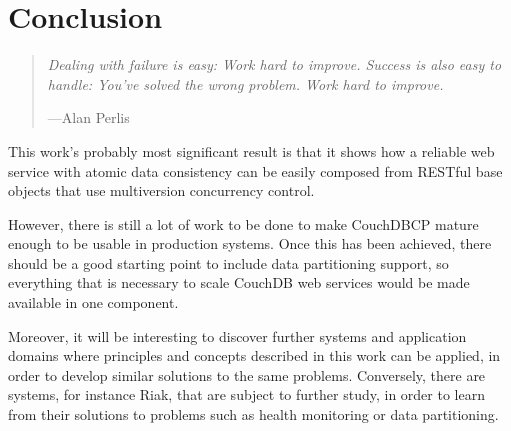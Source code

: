 \chapter{Conclusion}

\begin{quote}
{\itshape
Dealing with failure is easy: Work hard to improve. Success is also easy to handle: You've solved the wrong problem. Work hard to improve.
}

\hspace{1em}---Alan Perlis \cite{Per82}\\
\end{quote}

\noindent
This work's probably most significant result is that it shows how a reliable web service with atomic data consistency can be easily composed from RESTful base objects that use multiversion concurrency control.

However, there is still a lot of work to be done to make CouchDBCP mature enough to be usable in production systems. Once this has been achieved, there should be a good starting point to include data partitioning support, so everything that is necessary to scale CouchDB web services would be made available in one component.

Moreover, it will be interesting to discover further systems and application domains where principles and concepts described in this work can be applied, in order to develop similar solutions to the same problems. Conversely, there are systems, for instance Riak, that are subject to further study, in order to learn from their solutions to problems such as health monitoring or data partitioning.

